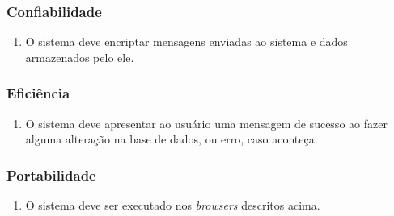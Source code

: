 \documentclass[
10pt, %
a4paper, %
oneside, %
headinclude,footinclude, %
BCOR5mm, %
]{scrartcl}
\begin{document}
\subsubsection{Confiabilidade}
\begin{enumerate}[noitemsep]
	\item O sistema deve encriptar mensagens enviadas ao sistema e dados armazenados pelo ele.
\end{enumerate}
\subsubsection{Eficiência}
\begin{enumerate}[noitemsep]
	\item O sistema deve apresentar ao usuário uma mensagem de sucesso ao fazer alguma alteração na base de dados, ou erro, caso aconteça.
\end{enumerate}
\subsubsection{Portabilidade}
\begin{enumerate}[noitemsep]
	\item O sistema deve ser executado nos \textit{browsers} descritos acima.
\end{enumerate}








\end{document}
